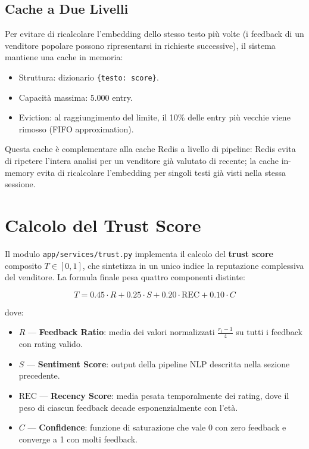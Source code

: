 \subsection{Cache a Due Livelli}
\label{subsec:sentiment-cache}

Per evitare di ricalcolare l'embedding dello stesso testo più volte
(i feedback di un venditore popolare possono ripresentarsi in richieste
successive), il sistema mantiene una cache in memoria:

\begin{itemize}
    \item Struttura: dizionario \texttt{\{testo: score\}}.
    \item Capacità massima: 5.000 entry.
    \item Eviction: al raggiungimento del limite, il 10\% delle entry
        più vecchie viene rimosso (FIFO approximation).
\end{itemize}

Questa cache è complementare alla cache Redis a livello di pipeline:
Redis evita di ripetere l'intera analisi per un venditore già
valutato di recente; la cache in-memory evita di ricalcolare
l'embedding per singoli testi già visti nella stessa sessione.


\section{Calcolo del Trust Score}
\label{sec:seller-trust}

Il modulo \texttt{app/services/trust.py} implementa il calcolo del
\textbf{trust score} composito $T \in [0, 1]$, che sintetizza in un
unico indice la reputazione complessiva del venditore. La formula
finale pesa quattro componenti distinte:

\[
    T = 0.45 \cdot R + 0.25 \cdot S + 0.20 \cdot \text{REC} + 0.10 \cdot C
\]

dove:
\begin{itemize}
    \item $R$ — \textbf{Feedback Ratio}: media dei valori normalizzati
        $\frac{r_i - 1}{4}$ su tutti i feedback con rating valido.
    \item $S$ — \textbf{Sentiment Score}: output della pipeline NLP
        descritta nella sezione precedente.
    \item $\text{REC}$ — \textbf{Recency Score}: media pesata
        temporalmente dei rating, dove il peso di ciascun feedback
        decade esponenzialmente con l'età.
    \item $C$ — \textbf{Confidence}: funzione di saturazione che vale
        0 con zero feedback e converge a 1 con molti feedback.
\end{itemize}

